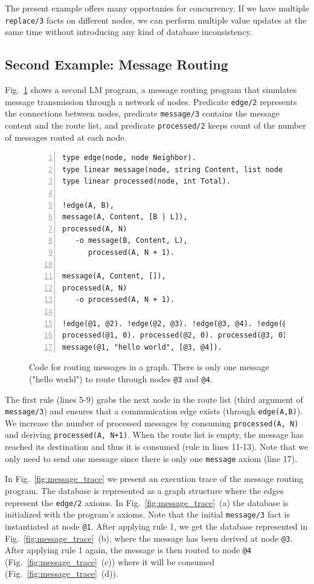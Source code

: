 The present example offers many opportunies for concurrency. If we have multiple
\texttt{replace/3} facts on different nodes, we can perform multiple value
updates at the same time without introducing any kind of database inconsistency.

\subsection{Second Example: Message Routing}

Fig.~\ref{code:message} shows a second LM program, a message routing program
that simulates message transmission through a network of nodes.  Predicate
\texttt{edge/2} represents the connections between nodes, predicate
\texttt{message/3} contains the message content and the route list, and
predicate \texttt{processed/2} keeps count of the number of messages routed at
each node.

\begin{figure}[h!]
\scriptsize\begin{Verbatim}[numbers=left]
type edge(node, node Neighbor).
type linear message(node, string Content, list node Routing).
type linear processed(node, int Total).

!edge(A, B),
message(A, Content, [B | L]),
processed(A, N)
   -o message(B, Content, L),
      processed(A, N + 1).

message(A, Content, []),
processed(A, N)
   -o processed(A, N + 1).

!edge(@1, @2). !edge(@2, @3). !edge(@3, @4). !edge(@1, @3).
processed(@1, 0). processed(@2, 0). processed(@3, 0). processed(@4, 0).
message(@1, "hello world", [@3, @4]).
\end{Verbatim}
\caption{Code for routing messages in a graph. There is only one message ("hello
world") to route through nodes \texttt{@3} and \texttt{@4}.}
\label{code:message}
\end{figure}

The first rule (lines 5-9) grabs the next node in the route list (third argument
of \texttt{message/3}) and ensures that a communication edge exists
(through \texttt{edge(A,B)}). We increase the number of processed messages by
consuming \texttt{processed(A,~N)} and deriving \texttt{processed(A,~N+1)}.
When the route list is empty, the message has reached its destination and thus
it is consumed (rule in lines 11-13).  Note that we only need to send one
message since there is only one \texttt{message} axiom (line 17).

In Fig.~\ref{fig:message_trace} we present an execution trace of the message
routing program.  The database is represented as a graph structure where the
edges represent the \texttt{edge/2} axioms. In Fig.~\ref{fig:message_trace}~(a)
the database is initialized with the program's axioms.  Note that the initial
\texttt{message/3} fact is instantiated at node \texttt{@1}. After applying rule 1,
we get the database represented in Fig.~\ref{fig:message_trace}~(b), where
the message has been derived at node \texttt{@3}. After applying rule 1
again, the message is then routed to node \texttt{@4}
(Fig.~\ref{fig:message_trace}~(c)) where it will be consumed
(Fig.~\ref{fig:message_trace}~(d)).

